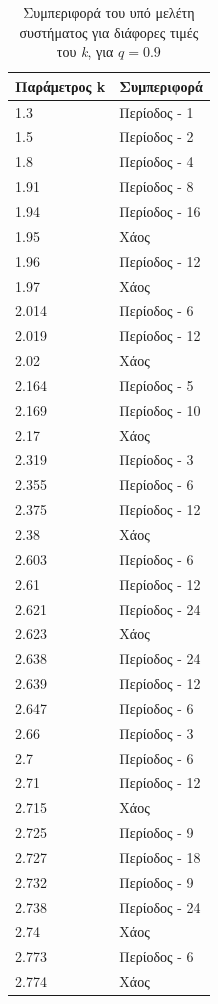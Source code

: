 \begin{table}[ht]
	\centering
	\caption{ Συμπεριφορά του υπό μελέτη συστήματος για διάφορες τιμές του \emph{k}, για $q=0.9$ }
	\label{tab:abc13}
	\begin{tabular}{l | l}
		Παράμετρος k & Συμπεριφορά \\
		\hline
		1.3 &  Περίοδος -  1 \\
		1.5 &  Περίοδος -  2 \\
		1.8& Περίοδος -  4 \\
		1.91& Περίοδος -  8 \\
		1.94& Περίοδος -  16 \\
		1.95 & Xάος \\
		1.96& Περίοδος - 12 \\
		1.97& Xάος \\
		2.014& Περίοδος - 6 \\
		2.019& Περίοδος - 12\\
		2.02& Χάος \\
		2.164& Περίοδος - 5 \\
		2.169 &  Περίοδος - 10  \\
		2.17 &  Χάος \\
		2.319& Περίοδος - 3 \\
		2.355 &  Περίοδος - 6  \\
		2.375 &  Περίοδος -  12 \\
		2.38 &Χάος \\
		2.603 & Περίοδος - 6\\
		2.61& Περίοδος - 12\\
		2.621& Περίοδος - 24\\
		2.623& Xάος\\
		2.638 & Περίοδος - 24\\
		2.639& Περίοδος - 12\\
		2.647& Περίοδος - 6\\
		2.66 & Περίοδος - 3\\
		2.7 & Περίοδος -  6\\
		2.71 & Περίοδος -  12\\
		2.715 & Xάος\\
		2.725 & Περίοδος - 9\\
		2.727 & Περίοδος -  18\\
		2.732 & Περίοδος -  9\\
		2.738 & Περίοδος -  24\\
		2.74& Χάος\\
		2.773 & Περίοδος -  6\\
		2.774& Χάος\\
		
	\end{tabular}
	
\end{table}


